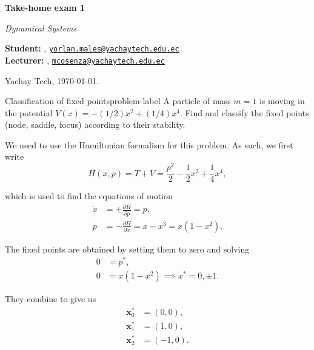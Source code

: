 





\textsf{\LARGE{\textbf{Take-home exam 1}}}

\normalsize{\textit{Dynamical Systems}}

\vspace{1ex}

\textsf{\textbf{Student:}} , 
\href{mailto:yorlan.males@yachaytech.edu.ec}{\texttt{yorlan.males@yachaytech.edu.ec}}\\
\textsf{\textbf{Lecturer:}} , 
\href{mcosenza@yachaytech.edu.ec}{\texttt{mcosenza@yachaytech.edu.ec}}

Yachay Tech, \today.

\vspace{2ex}

\begin{problem}{Classification of fixed points}{problem-label}
A particle of mass $m = 1$ is moving in the potential $V(x) = - (1/2)x^2 + (1/4)x^4$.
Find and classify the fixed points (node, saddle, focus) according to their stability.
\end{problem}

We need to use the Hamiltonian formalism for this problem.
As such, we first write
\[
    \label{eq:hamiltonian}
    H(x, p) = T + V = \frac{p^2}{2} - \frac{1}{2}x^2 + \frac{1}{4}x^4,
\]

which is used to find the equations of motion
\[
    \label{eq:hamiltonian_eqs}
    \begin{aligned}
        \dot{x} &= +\frac{\partial H}{\partial p} = p,\\
        \dot{p} &= -\frac{\partial H}{\partial x} = x - x^3 = x(1 - x^2).
    \end{aligned}
\]

The fixed points are obtained by setting them to zero and
solving
\[
    \begin{aligned}
        0 &= p^*,\\
        0 &= x(1 - x^2) \implies x^* = 0, \pm 1.
    \end{aligned}
\]

They combine to give us
\[
    \begin{aligned}
        \textbf{x}_0^* &= (0, 0),\\
        \textbf{x}_1^* &= (1, 0),\\
        \textbf{x}_2^* &= (-1, 0).
    \end{aligned}
\]


